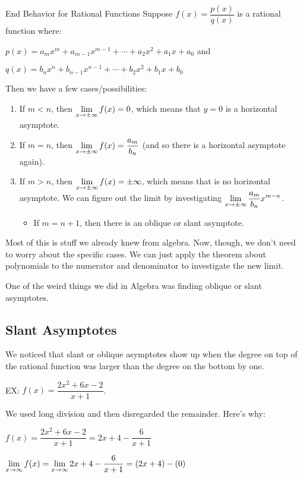 \begin{thm}{End Behavior for Rational Functions}
  Suppose $f(x)=\dfrac{p(x)}{q(x)}$ is a rational function where:

  $p(x) = a_mx^m+a_{m-1}x^{m-1}+\cdots+a_2x^2+a_1x+a_0$ and

  $q(x) = b_nx^n+b_{n-1}x^{n-1}+\cdots+b_2x^2+b_1x+b_0$

  Then we have a few cases/possibilities:
  \begin{enumerate}
    \item If $m<n$, then $\displaystyle \lim_{x\to\pm\infty} f(x)=0$, which means that $y=0$ is a horizontal asymptote.
    \item If $m=n$, then $\displaystyle \lim_{x\to\pm\infty} f(x) = \dfrac{a_m}{b_n}$ (and so there is a horizontal asymptote again).
    \item If $m>n$, then $\displaystyle \lim_{x\to\pm\infty} f(x)=\pm\infty$, which means that is no horizontal asymptote. We can figure out the limit by investigating $\displaystyle \lim_{x\to\pm\infty} \dfrac{a_m}{b_n} x^{m-n}$.
    \begin{itemize}
      \item If $m=n+1$, then there is an oblique or slant asymptote.
    \end{itemize}
  \end{enumerate}
\end{thm}

Most of this is stuff we already knew from algebra.
Now, though, we don't need to worry about the specific cases.
We can just apply the theorem about polynomials to the numerator and denominator to investigate the new limit.

One of the weird things we did in Algebra was finding oblique or slant asymptotes.

\subsection*{Slant Asymptotes}

We noticed that slant or oblique asymptotes show up when the degree on top of the rational function was larger than the degree on the bottom by one.

EX: $f(x)=\dfrac{2x^2+6x-2}{x+1}$.

We used long division and then disregarded the remainder.
Here's why:

$f(x) = \dfrac{2x^2+6x-2}{x+1} = 2x+4- \dfrac{6}{x+1}$

$\displaystyle \lim_{x\to\infty} f(x) = \displaystyle \lim_{x\to\infty} 2x+4- \dfrac{6}{x+1} = (2x+4)-(0)$

